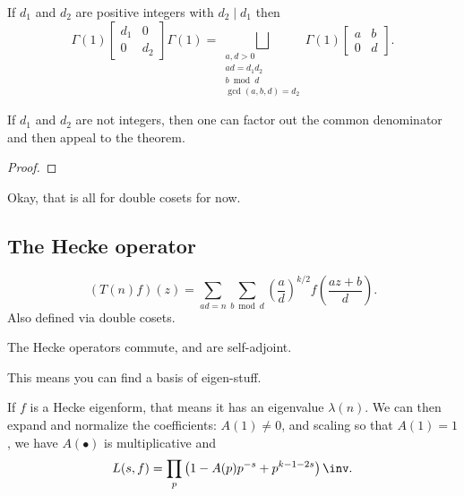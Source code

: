 \begin{theorem}
  If $d_1$ and $d_2$ are positive integers with $d_2 \mid d_1$ then
  \[ \Gamma(1) \begin{bmatrix} d_1 & 0 \\ 0 & d_2 \end{bmatrix} \Gamma(1)
    = \bigsqcup_{\substack{a,d > 0 \\
      ad = d_1d_2 \\
      b \bmod d \\
      \gcd(a,b,d)=d_2}}
    \Gamma(1) \begin{bmatrix} a & b \\ 0 & d \end{bmatrix}.  \]
\end{theorem}
If $d_1$ and $d_2$ are not integers,
then one can factor out the common denominator
and then appeal to the theorem.
\begin{proof}
\end{proof}

Okay, that is all for double cosets for now.

\subsection{The Hecke operator}
\[
  (T(n) f)(z) = \sum_{ad=n}\sum_{b \bmod d} \left( \frac ad \right)^{k/2}
  f\left( \frac{az+b}{d} \right).
\]
Also defined via double cosets.

\begin{proposition}
  The Hecke operators commute,
  and are self-adjoint.
\end{proposition}
This means you can find a basis of eigen-stuff.

If $f$ is a Hecke eigenform, that means it has an eigenvalue $\lambda(n)$.
We can then expand and normalize the coefficients:
$A(1) \neq 0$, and scaling so that $A(1)=1$, we have $A(\bullet)$ is multiplicative and
\[ L(s,f) = \prod_p \left( 1 - A(p) p^{-s} + p^{k-1-2s} \right)\inv. \]
